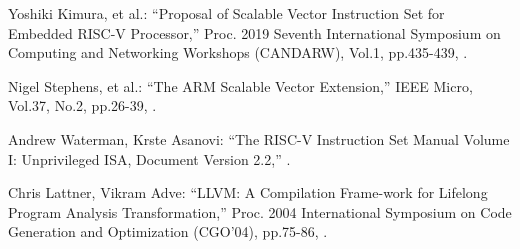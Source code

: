 ﻿\documentclass[a4j]{jarticle}
\begin{document}
\begin{thebibliography}{9}
\vspace{-1mm}
\itemsep -1.7pt
{\footnotesize

{\small Yoshiki Kimura, et al.:      %
\newblock ``Proposal of Scalable Vector Instruction Set for Embedded RISC-V Processor,''
\newblock Proc. 2019 Seventh International Symposium on Computing and Networking Workshops (CANDARW),
\newblock Vol.1,
\newblock pp.435-439,
.}

{\small Nigel Stephens, et al.:      %
\newblock ``The ARM Scalable Vector Extension,''
\newblock IEEE Micro,
\newblock Vol.37,
\newblock No.2,
\newblock pp.26-39,
.}

{\small Andrew Waterman, Krste Asanovi:      %
\newblock ``The RISC-V Instruction Set Manual Volume I: Unprivileged ISA, Document Version 2.2,''
.}

{\small Chris Lattner, Vikram Adve:      %
\newblock ``LLVM: A Compilation Frame-work for Lifelong Program Analysis Transformation,''
\newblock Proc. 2004 International Symposium on Code Generation and Optimization (CGO’04),
\newblock pp.75-86,
.}

}

\end{thebibliography}
\end{document}

